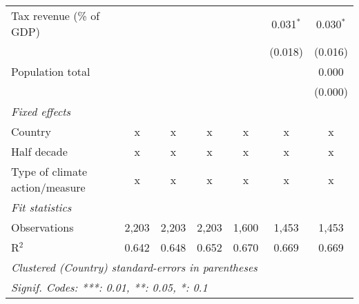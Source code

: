\begin{tabular}{lcccccc}
   Tax revenue (\% of GDP)                &         &                &                &                & 0.031$^{*}$    & 0.030$^{*}$\\   
                                          &         &                &                &                & (0.018)        & (0.016)\\   
   Population total                       &         &                &                &                &                & 0.000\\   
                                          &         &                &                &                &                & (0.000)\\   
   \emph{Fixed effects}\\
   Country                                & x       & x              & x              & x              & x              & x\\  
   Half decade                            & x       & x              & x              & x              & x              & x\\  
   Type of climate action/measure         & x       & x              & x              & x              & x              & x\\  
   \midrule \emph{Fit statistics}\\
   Observations                           & 2,203   & 2,203          & 2,203          & 1,600          & 1,453          & 1,453\\  
   R$^2$                                  & 0.642   & 0.648          & 0.652          & 0.670          & 0.669          & 0.669\\  
   \midrule
   \multicolumn{7}{l}{\emph{Clustered (Country) standard-errors in parentheses}}\\
   \multicolumn{7}{l}{\emph{Signif. Codes: ***: 0.01, **: 0.05, *: 0.1}}\\
\end{tabular}
\par\endgroup


